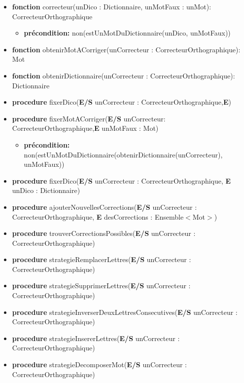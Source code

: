 \documentclass{article}
\begin{document}
	\begin{itemize}[label=$\ $, leftmargin=1cm]
		 
		 \item \textbf{fonction} correcteur(unDico : Dictionnaire, unMotFaux : unMot): CorrecteurOrthographique
		 \begin{itemize}[label=$| $]
            \item \textbf{précondition:} non(estUnMotDuDictionnaire(unDico, unMotFaux))
         \end{itemize}
		 \item \textbf{fonction} obtenirMotACorriger(unCorrecteur : CorrecteurOrthographique): Mot
		 \item \textbf{fonction} obtenirDictionnaire(unCorrecteur : CorrecteurOrthographique): Dictionnaire
		 \item \textbf{procedure} fixerDico(\textbf{E/S} unCorrecteur : CorrecteurOrthographique,\textbf{E})
		 \item \textbf{procedure} fixerMotACorriger(\textbf{E/S} unCorrecteur: CorrecteurOrthographique,\textbf{E} unMotFaux : Mot)
		 \begin{itemize}[label=$| $]
            \item \textbf{précondition:} non(estUnMotDuDictionnaire(obtenirDictionnaire(unCorrecteur), unMotFaux))
         \end{itemize}
		 \item \textbf{procedure} fixerDico(\textbf{E/S} unCorrecteur : CorrecteurOrthographique, \textbf{E} unDico : Dictionnaire)
		 \item \textbf{procedure} ajouterNouvellesCorrections(\textbf{E/S} unCorrecteur : CorrecteurOrthographique, \textbf{E} desCorrections : Ensemble$<$Mot$>$)
		 \item \textbf{procedure} trouverCorrectionsPossibles(\textbf{E/S} unCorrecteur : CorrecteurOrthographique)
		 \item \textbf{procedure} strategieRemplacerLettres(\textbf{E/S} unCorrecteur : CorrecteurOrthographique)
		 \item \textbf{procedure} strategieSupprimerLettres(\textbf{E/S} unCorrecteur : CorrecteurOrthographique)
		 \item \textbf{procedure} strategieInverserDeuxLettresConsecutives(\textbf{E/S} unCorrecteur : CorrecteurOrthographique)
		 \item \textbf{procedure} strategieInsererLettres(\textbf{E/S} unCorrecteur : CorrecteurOrthographique)
		 \item \textbf{procedure} strategieDecomposerMot(\textbf{E/S} unCorrecteur : CorrecteurOrthographique)
		 
		 
		 
         
         
        
	\end{itemize} 
    
\end{document}
